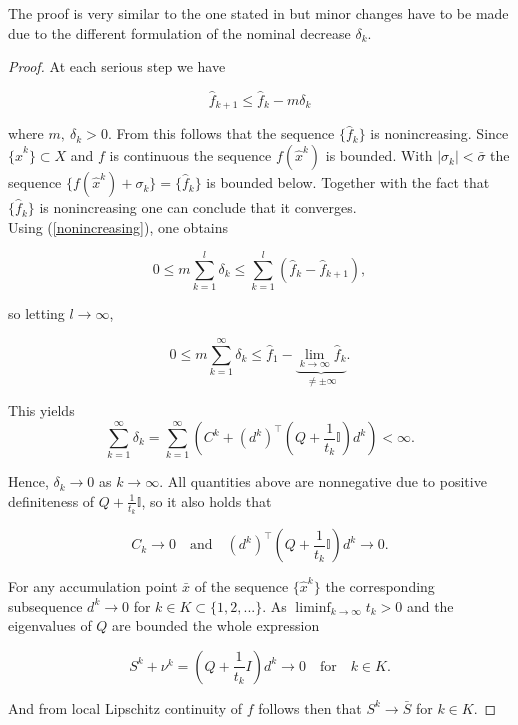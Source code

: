 The proof is very similar to the one stated in \cite{Hare2016} but minor changes have to be made due to the different formulation of the nominal decrease \(\delta_k\).

\begin{proof}
	At each serious step we have
	
	\begin{equation}
		\hat{f}_{k+1} \leq \hat{f}_k - m\delta_k
	\label{nonincreasing}
	\end{equation}
	
	where \(m, ~\delta_k > 0\). From this follows that the sequence \(\{\hat{f}_k\}\) is nonincreasing.
	Since \(\{\hat{x}^k\} \subset X\) and \(f\) is continuous the sequence \(f(\hat{x}^k)\) is bounded. %
	With \(|\sigma_k| < \bar{\sigma}\) the sequence \(\{f(\hat{x}^k)+\sigma_k\} = \{\hat{f}_k\}\) is bounded below. Together with the fact that \(\{\hat{f}_k\}\) is nonincreasing one can conclude that it converges. \\
	Using (\ref{nonincreasing}), one obtains
	
	\begin{equation*}
		0 \leq m \sum_{k = 1}^l \delta_k \leq \sum_{k = 1}^l \left(\hat{f}_k-\hat{f}_{k+1}\right),
	\end{equation*}
	
	so letting \(l \to \infty\), 
	
	\begin{equation*}
		0 \leq m\sum_{k=1}^{\infty} \delta_k \leq \hat{f}_1 - \underbrace{\lim_{k \to \infty} \hat{f}_k}_{\neq \pm \infty}.
	\end{equation*}
	
	This yields
	\begin{equation*}
		\sum_{k = 1}^{\infty} \delta_k = \sum_{k=1}^{\infty}\left(C^k+(d^k)^{\top}\left(Q+\frac{1}{t_k}\mathbb{I}\right)d^k\right) < \infty.
	\end{equation*}
	
	Hence, \(\delta_k \to 0\) as \(k \to \infty\). All quantities above are nonnegative due to positive definiteness of \(Q+\frac{1}{t_k}\mathbb{I}\), so it also holds that
	
	\begin{equation*}
		C_k \to 0 \quad \text{and} \quad (d^k)^{\top}\left(Q+\frac{1}{t_k}\mathbb{I}\right)d^k \to 0.
	\end{equation*}
	
	For any accumulation point \(\bar{x}\) of the sequence \(\{\hat{x}^k\}\) the corresponding subsequence \(d^k \to 0\) for \(k \in K \subset \{1,2,...\} \). As \(\liminf_{k \to \infty} t_k > 0\) and the eigenvalues of \(Q\) are bounded the whole expression 
	
	\begin{equation*}
	 S^k + \nu^k = \left(Q+\frac{1}{t_k}I \right)d^k  \to 0 \quad \text{for} \quad k \in K.
	\end{equation*}
	
	And from local Lipschitz continuity of \(f\) follows then that \(S^k \to \bar{S}\) for \(k \in K\).
	
\end{proof}

